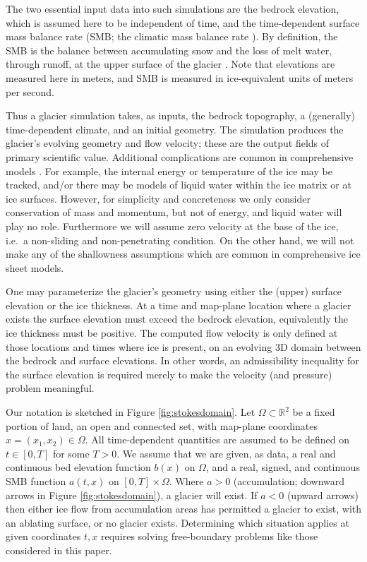 \documentclass[hidelinks,onefignum,onetabnum,final]{siamart220329}  %
\newcommand{\RR}{\mathbb{R}}
\begin{document}
The two essential input data into such simulations are the bedrock elevation, which is assumed here to be independent of time, and the time-dependent surface mass balance rate (SMB; the climatic mass balance rate \cite{Cogleyetal2011}).  By definition, the SMB is the balance between accumulating snow and the loss of melt water, through runoff, at the upper surface of the glacier \cite{Cogleyetal2011}.  Note that elevations are measured here in meters, and SMB is measured in ice-equivalent units of meters per second.

Thus a glacier simulation takes, as inputs, the bedrock topography, a (generally) time-dependent climate, and an initial geometry.  The simulation produces the glacier's evolving geometry and flow velocity; these are the output fields of primary scientific value.  Additional complications are common in comprehensive models \cite{SchoofHewitt2013,Winkelmannetal2011}.  For example, the internal energy \cite{Aschwandenetal2012} or temperature of the ice may be tracked, and/or there may be models of liquid water within the ice matrix or at ice surfaces.  However, for simplicity and concreteness we only consider conservation of mass and momentum, but not of energy, and liquid water will play no role.  Furthermore we will assume zero velocity at the base of the ice, i.e.~a non-sliding and non-penetrating condition.  On the other hand, we will not make any of the shallowness assumptions which are common in comprehensive ice sheet models.

One may parameterize the glacier's geometry using either the (upper) surface elevation or the ice thickness.  At a time and map-plane location where a glacier exists the surface elevation must exceed the bedrock elevation, equivalently the ice thickness must be positive.  The computed flow velocity is only defined at those locations and times where ice is present, on an evolving 3D domain between the bedrock and surface elevations.  In other words, an admissibility inequality for the surface elevation is required merely to make the velocity (and pressure) problem meaningful.

Our notation is sketched in Figure \ref{fig:stokesdomain}.  Let $\Omega \subset \RR^2$ be a fixed portion of land, an open and connected set, with map-plane coordinates $x=(x_1,x_2)\in\Omega$.  All time-dependent quantities are assumed to be defined on $t\in [0,T]$ for some $T>0$.  We assume that we are given, as data, a real and continuous bed elevation function $b(x)$ on $\Omega$, and a real, signed, and continuous SMB function $a(t,x)$ on $[0,T]\times \Omega$.  Where $a>0$ (accumulation; downward arrows in Figure \ref{fig:stokesdomain}), a glacier will exist.  If $a<0$ (upward arrows) then either ice flow from accumulation areas has permitted a glacier to exist, with an ablating surface, or no glacier exists.  Determining which situation applies at given coordinates $t,x$ requires solving free-boundary problems like those considered in this paper.
\end{document}
